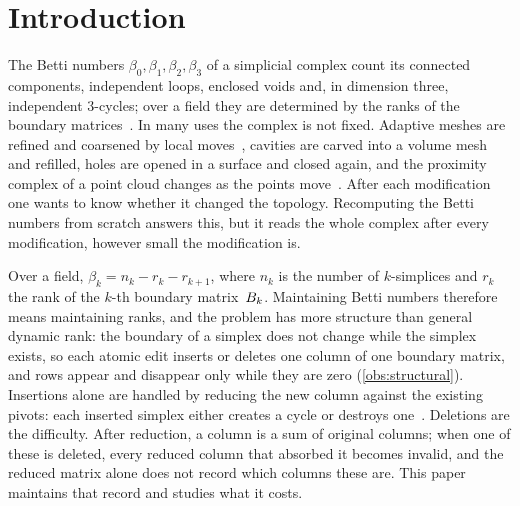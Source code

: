 \section{Introduction}\label{sec:intro}

The Betti numbers $\beta_0,\beta_1,\beta_2,\beta_3$ of a simplicial complex count
its connected components, independent loops, enclosed voids and, in dimension
three, independent $3$-cycles; over a field they are determined by the ranks of
the boundary matrices~\cite{munkres1984elements,hatcher2002algebraic,edelsbrunner2010computational}.
In many uses the complex is not fixed. Adaptive meshes are refined and
coarsened by local moves~\cite{pachner1991pl}, cavities are carved into a volume
mesh and refilled, holes are opened in a surface and closed again, and the
proximity complex of a point cloud changes as the points
move~\cite{carlsson2009topology}. After each modification one wants to know
whether it changed the topology. Recomputing the Betti numbers from scratch
answers this, but it reads the whole complex after every modification, however
small the modification is.

Over a field, $\beta_k=n_k-r_k-r_{k+1}$, where $n_k$ is the number of
$k$-simplices and $r_k$ the rank of the $k$-th boundary matrix~$B_{k}$.
Maintaining Betti numbers therefore means maintaining ranks, and the problem has
more structure than general dynamic rank: the boundary of a simplex does not
change while the simplex exists, so each atomic edit inserts or deletes one
column of one boundary matrix, and rows appear and disappear only while they are
zero (\cref{obs:structural}). Insertions alone are handled by reducing the new
column against the existing pivots: each inserted simplex either creates a cycle
or destroys one~\cite{delfinado1995incremental}. Deletions are the difficulty.
After reduction, a column is a sum of original columns; when one of these is
deleted, every reduced column that absorbed it becomes invalid, and the reduced
matrix alone does not record which columns these are. This paper maintains that
record and studies what it costs.

